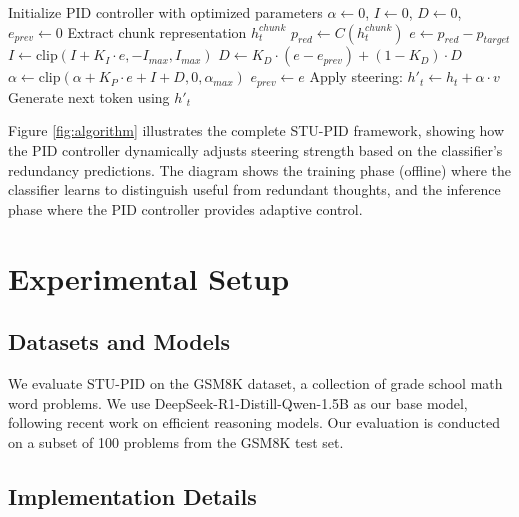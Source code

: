 \documentclass{article}
\begin{document}
\begin{algorithm}
\caption{STU-PID Inference}
\begin{algorithmic}[1]
\State Initialize PID controller with optimized parameters
\State $\alpha \leftarrow 0$, $I \leftarrow 0$, $D \leftarrow 0$, $e_{prev} \leftarrow 0$
        \State Extract chunk representation $h_t^{chunk}$
        \State $p_{red} \leftarrow C(h_t^{chunk})$
        \State $e \leftarrow p_{red} - p_{target}$
            \State $I \leftarrow \text{clip}(I + K_I \cdot e, -I_{max}, I_{max})$
            \State $D \leftarrow K_D \cdot (e - e_{prev}) + (1 - K_D) \cdot D$
            \State $\alpha \leftarrow \text{clip}(\alpha + K_P \cdot e + I + D, 0, \alpha_{max})$
        \EndIf
        \State $e_{prev} \leftarrow e$
    \EndIf
    \State Apply steering: $h'_t \leftarrow h_t + \alpha \cdot v$
    \State Generate next token using $h'_t$
\EndFor
\end{algorithmic}
\end{algorithm}

Figure \ref{fig:algorithm} illustrates the complete STU-PID framework, showing how the PID controller dynamically adjusts steering strength based on the classifier's redundancy predictions. The diagram shows the training phase (offline) where the classifier learns to distinguish useful from redundant thoughts, and the inference phase where the PID controller provides adaptive control.

\section{Experimental Setup}

\subsection{Datasets and Models}

We evaluate STU-PID on the GSM8K dataset, a collection of grade school math word problems. We use DeepSeek-R1-Distill-Qwen-1.5B as our base model, following recent work on efficient reasoning models. Our evaluation is conducted on a subset of 100 problems from the GSM8K test set.

\subsection{Implementation Details}
\end{document}
